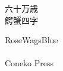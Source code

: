 \documentclass[letterpaper]{article}
\begin{document}
\fontsize{24}{24}
\vfill

\begin{center}
\begin{multicols}{2}
\RLmulticolcolumns
六十万歳\\
鰐蟹四字\\
\end{multicols}
\vfill
\hspace{0pt}

RoseWagsBlue\\
\the\year\ \\
Coneko Press
\end{center}



\newpage
\end{document}
